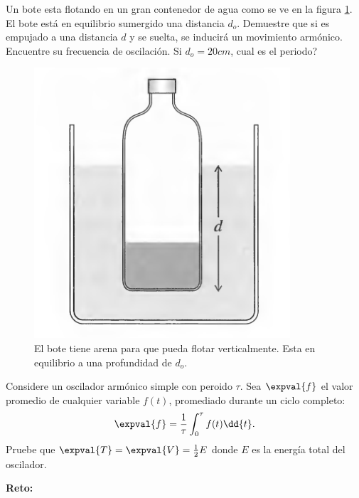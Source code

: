 \begin{mdframed}[style=warning]
	\begin{ejercicio}
		Un bote esta flotando en un gran contenedor de agua como se ve en la figura \ref{ej4}. El bote está en equilibrio sumergido una distancia $d_o$. Demuestre que si es empujado a una distancia $d$ y se suelta, se inducirá un movimiento armónico. Encuentre su frecuencia de oscilación. Si $d_o = 20cm$, cual es el periodo?
		
		\begin{figure}[H]
			\centering
			\includegraphics[scale=0.3]{./img/ej4.png}
			\caption{\centering El bote tiene arena para que pueda flotar verticalmente. Esta en equilibrio a una profundidad de $d_o$.}
			\label{ej4}
		\end{figure}
	\end{ejercicio}
\end{mdframed}



\begin{mdframed}[style=warning]
	\begin{ejercicio}
		Considere un oscilador armónico simple con peroido $\tau$. Sea $\expval{f}$ el valor promedio de cualquier variable $f(t)$, promediado durante un ciclo completo:
			$$ \expval{f} = \frac{1}{\tau} \int _0 ^\tau f(t) \dd{t}. $$
		Pruebe que $\expval{T} = \expval{V} = \frac{1}{2} E$ donde $E$ es la energía total del oscilador.
	\end{ejercicio}
\end{mdframed}

\textbf{Reto:}

